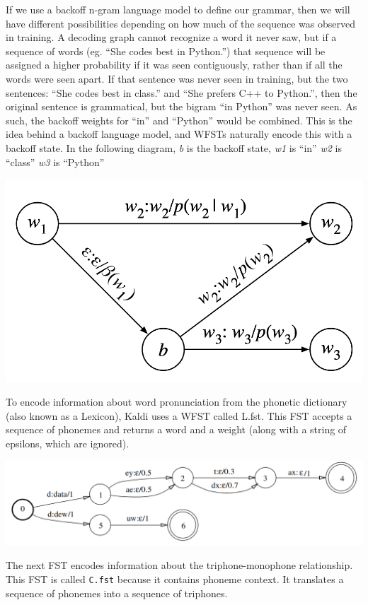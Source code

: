 \documentclass[10pt,a4paper]{article}
\begin{document}
If we use a backoff n-gram language model to define our grammar, then we will have different possibilities depending on how much of the sequence was observed in training. A decoding graph cannot recognize a word it never saw, but if a sequence of words (eg. ``She codes best in Python.'') that sequence will be assigned a higher probability if it was seen contiguously, rather than if all the words were seen apart.  If that sentence was never seen in training, but the two sentences: ``She codes best in class.'' and ``She prefers C++ to Python.'', then the original sentence is grammatical, but the bigram ``in Python'' was never seen. As such, the backoff weights for ``in'' and ``Python'' would be combined. This is the idea behind a backoff language model, and WFSTs naturally encode this with a backoff state. In the following diagram, \textit{b} is the backoff state, \textit{w1} is ``in'' \textit{w2} is ``class'' \textit{w3} is ``Python''

\begin{center}
  \includegraphics[width=.6\textwidth,keepaspectratio]{figs/mohri-backoff.png}
\end{center}

To encode information about word pronunciation from the phonetic dictionary (also known as a Lexicon), Kaldi uses a WFST called L.fst. This FST accepts a sequence of phonemes and returns a word and a weight (along with a string of epsilons, which are ignored).

\begin{center}
  \includegraphics[width=.9\textwidth,keepaspectratio]{figs/mohri-L.png}
\end{center}

The next FST encodes information about the triphone-monophone relationship. This FST is called \texttt{C.fst} because it contains phoneme context. It translates a sequence of phonemes into a sequence of triphones.
\end{document}
